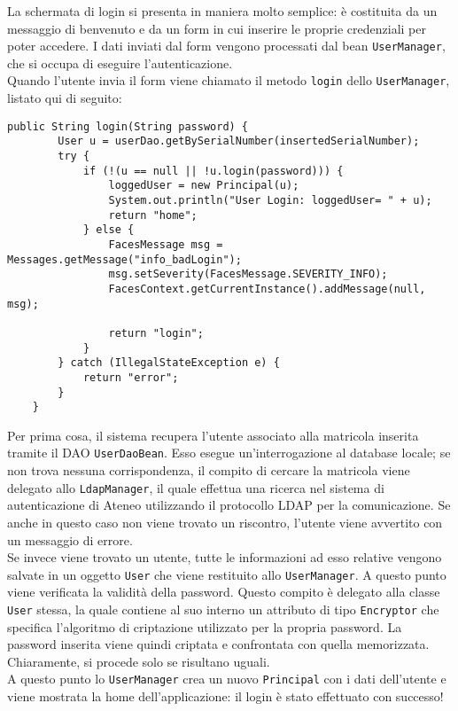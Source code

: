 

La schermata di login si presenta in maniera molto semplice: è costituita da un messaggio di benvenuto e da un form in cui inserire le proprie credenziali per poter accedere. I dati inviati dal form vengono processati dal bean \lstinline{UserManager}, che si occupa di eseguire l'autenticazione.\\
Quando l'utente invia il form viene chiamato il metodo \lstinline{login} dello \lstinline{UserManager}, listato qui di seguito:

\begin{lstlisting}
public String login(String password) {
		User u = userDao.getBySerialNumber(insertedSerialNumber);
		try {
			if (!(u == null || !u.login(password))) {
				loggedUser = new Principal(u);
				System.out.println("User Login: loggedUser= " + u);
				return "home";
			} else {
				FacesMessage msg = Messages.getMessage("info_badLogin");
				msg.setSeverity(FacesMessage.SEVERITY_INFO);
				FacesContext.getCurrentInstance().addMessage(null, msg);
				
				return "login";
			}
		} catch (IllegalStateException e) {
			return "error";
		}
	}
\end{lstlisting}

Per prima cosa, il sistema recupera l'utente associato alla matricola inserita tramite il DAO \lstinline{UserDaoBean}. Esso esegue un'interrogazione al database locale; se non trova nessuna corrispondenza, il compito di cercare la matricola viene delegato  allo \lstinline{LdapManager}, il quale effettua una ricerca nel sistema di autenticazione di Ateneo utilizzando il protocollo LDAP per la comunicazione. Se anche in questo caso non viene trovato un riscontro, l'utente viene avvertito con un messaggio di errore.\\
Se invece viene trovato un utente, tutte le informazioni ad esso relative vengono salvate in un oggetto \lstinline{User} che viene restituito allo \lstinline{UserManager}. A questo punto viene verificata la validità della password. Questo compito è delegato alla classe \lstinline{User} stessa, la quale contiene al suo interno un attributo di tipo \lstinline{Encryptor} che specifica l'algoritmo di criptazione utilizzato per la propria password. La password inserita viene quindi criptata e confrontata con quella memorizzata. Chiaramente, si procede solo se risultano uguali.\\
A questo punto lo \lstinline{UserManager} crea un nuovo \lstinline{Principal} con i dati dell'utente e viene mostrata la home dell'applicazione: il login è stato effettuato con successo!